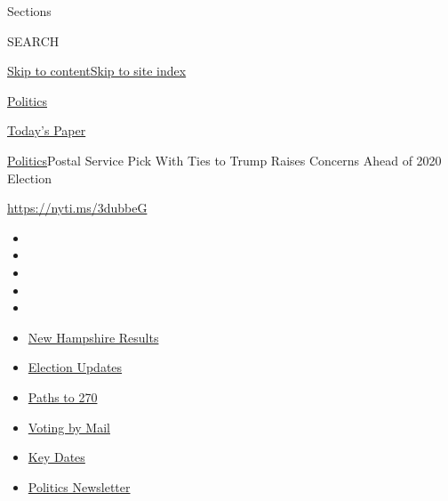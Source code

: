 Sections

SEARCH

\protect\hyperlink{site-content}{Skip to
content}\protect\hyperlink{site-index}{Skip to site index}

\href{https://www.nytimes3xbfgragh.onion/section/politics}{Politics}

\href{https://myaccount.nytimes3xbfgragh.onion/auth/login?response_type=cookie\&client_id=vi}{}

\href{https://www.nytimes3xbfgragh.onion/section/todayspaper}{Today's
Paper}

\href{/section/politics}{Politics}\textbar{}Postal Service Pick With
Ties to Trump Raises Concerns Ahead of 2020 Election

\url{https://nyti.ms/3dubbeG}

\begin{itemize}
\item
\item
\item
\item
\item
\end{itemize}

\begin{itemize}
\item
  \href{https://www.nytimes3xbfgragh.onion/interactive/2020/09/08/us/elections/results-new-hampshire-primary-elections.html?action=click\&pgtype=Article\&state=default\&region=TOP_BANNER\&context=storylines_menu}{New
  Hampshire Results}
\item
  \href{https://www.nytimes3xbfgragh.onion/live/2020/09/08/us/trump-vs-biden?action=click\&pgtype=Article\&state=default\&region=TOP_BANNER\&context=storylines_menu}{Election
  Updates}
\item
  \href{https://www.nytimes3xbfgragh.onion/interactive/2020/us/elections/election-states-biden-trump.html?action=click\&pgtype=Article\&state=default\&region=TOP_BANNER\&context=storylines_menu}{Paths
  to 270}
\item
  \href{https://www.nytimes3xbfgragh.onion/interactive/2020/08/31/us/politics/vote-by-mail-deadlines.html?action=click\&pgtype=Article\&state=default\&region=TOP_BANNER\&context=storylines_menu}{Voting
  by Mail}
\item
  \href{https://www.nytimes3xbfgragh.onion/interactive/2019/us/elections/2020-presidential-election-calendar.html?action=click\&pgtype=Article\&state=default\&region=TOP_BANNER\&context=storylines_menu}{Key
  Dates}
\item
  \href{https://www.nytimes3xbfgragh.onion/newsletters/politics?action=click\&pgtype=Article\&state=default\&region=TOP_BANNER\&context=storylines_menu}{Politics
  Newsletter}
\end{itemize}

